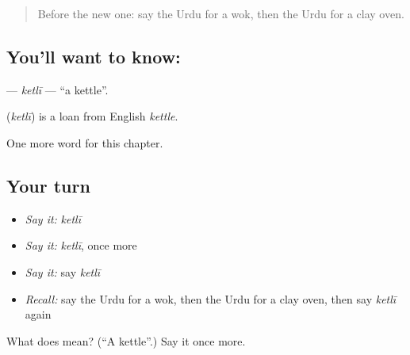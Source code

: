 \label{lesson:UR-C250-ketli}



\begin{quote}
Before the new one: say the Urdu for a wok, then the Urdu for a clay oven.
\end{quote}

\subsection*{You'll want to know: }
\textbf{} — \emph{ketlī} — \textquotedblleft{}a kettle\textquotedblright{}.

\begin{cousinweb}
\textbf{} (\emph{ketlī}) is a loan from English \emph{kettle}.
\end{cousinweb}

\begin{grammarlens}[title={What you've built}]
One more word for this chapter.
\end{grammarlens}

\subsection*{Your turn}
\begin{itemize}
\raggedright
  \item \emph{Say it:} \emph{ketlī}
  \item \emph{Say it:} \emph{ketlī}, once more
  \item \emph{Say it:} say \emph{ketlī}
  \item \emph{Recall:} say the Urdu for a wok, then the Urdu for a clay oven, then say \emph{ketlī} again
\end{itemize}

\begin{tcolorbox}[breakable,colback=teal!4,colframe=teal!35!black,title={Before you move on}]
What does  mean? (\textquotedblleft{}A kettle\textquotedblright{}.) Say it once more.
\end{tcolorbox}
